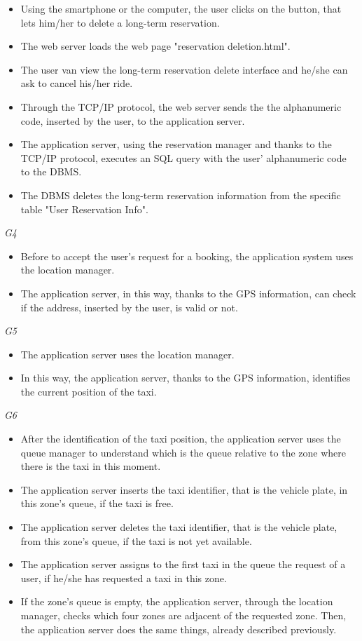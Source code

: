 		\begin{itemize}
			\item Using the smartphone or the computer, the user clicks on the button, that lets him/her to delete a long-term reservation.
			\item The web server loads the web page "reservation deletion.html".
			\item The user van view the long-term reservation delete interface and he/she can ask to cancel his/her ride.
			\item Through the TCP/IP protocol, the web server sends the the alphanumeric code, inserted by the user, to the application server.
			\item The application server, using the reservation manager and thanks to the TCP/IP protocol, executes an SQL query with the user' alphanumeric code to the DBMS.
			\item The DBMS deletes the long-term reservation information from the specific table "User Reservation Info".
		\end{itemize}
	\emph{G4}
		\begin{itemize}
			\item Before to accept the user's request for a booking, the application system uses the location manager.
			\item The application server, in this way, thanks to the GPS information, can check if the address, inserted by the user, is valid or not.
		\end{itemize}
	\emph{G5}
		\begin{itemize}
			\item The application server uses the location manager.
			\item In this way, the application server, thanks to the GPS information, identifies the current position of the taxi.
		\end{itemize}
	\emph{G6}
		\begin{itemize}
			\item After the identification of the taxi position, the application server uses the queue manager to understand which is the queue relative to the zone where there is the taxi in this moment.
			\item The application server inserts the taxi identifier, that is the vehicle plate, in this zone's queue, if the taxi is free.
			\item The application server deletes the taxi identifier, that is the vehicle plate, from this zone's queue, if the taxi is not yet available.
			\item The application server assigns to the first taxi in the queue the request of a user, if he/she has requested a taxi in this zone.
			\item If the zone's queue is empty, the application server, through the location manager, checks which four zones are adjacent of the requested zone. Then, the application server does the same things, already described previously.
		\end{itemize}
